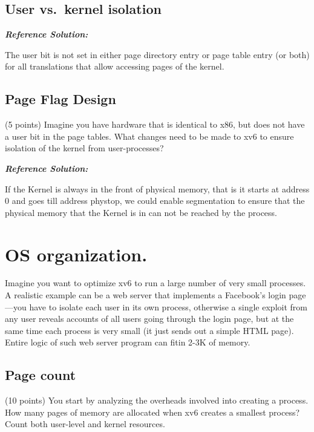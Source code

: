 \documentclass[]{article}
\begin{document}
\hypertarget{user-vs.kernel-isolation}{%
\subsection{User vs.~kernel isolation}\label{user-vs.kernel-isolation}}

\textbf{\emph{Reference Solution:}}

The user bit is not set in either page directory entry or page table
entry (or both) for all translations that allow accessing pages of the
kernel.

\hypertarget{page-flag-design}{%
\subsection{Page Flag Design}\label{page-flag-design}}

(5 points) Imagine you have hardware that is identical to x86, but does
not have a user bit in the page tables. What changes need to be made to
xv6 to ensure isolation of the kernel from user-processes?

\textbf{\emph{Reference Solution:}}

If the Kernel is always in the front of physical memory, that is it
starts at address 0 and goes till address phystop, we could enable
segmentation to ensure that the physical memory that the Kernel is in
can not be reached by the process.

\hypertarget{os-organization.}{%
\section{OS organization.}\label{os-organization.}}

Imagine you want to optimize xv6 to run a large number of very small
processes. A realistic example can be a web server that implements a
Facebook's login page---you have to isolate each user in its own
process, otherwise a single exploit from any user reveals accounts of
all users going through the login page, but at the same time each
process is very small (it just sends out a simple HTML page). Entire
logic of such web server program can fitin 2-3K of memory.

\hypertarget{page-count}{%
\subsection{Page count}\label{page-count}}

(10 points) You start by analyzing the overheads involved into creating
a process. How many pages of memory are allocated when xv6 creates a
smallest process? Count both user-level and kernel resources.
\end{document}

